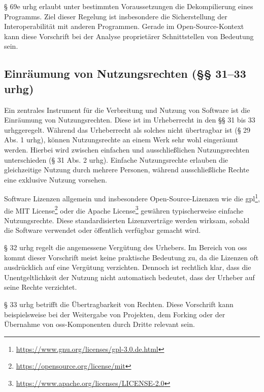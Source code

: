 § 69e \gls{urhg} erlaubt unter bestimmten Voraussetzungen die Dekompilierung eines Programms.
Ziel dieser Regelung ist insbesondere die Sicherstellung der Interoperabilität mit anderen Programmen.
Gerade im Open-Source-Kontext kann diese Vorschrift bei der Analyse proprietärer Schnittstellen von Bedeutung sein.


\subsection{Einräumung von Nutzungsrechten (§§ 31–33 \gls{urhg})}

Ein zentrales Instrument für die Verbreitung und Nutzung von Software ist die Einräumung von Nutzungsrechten.
Diese ist im Urheberrecht in den §§ 31 bis 33 \gls{urhg}geregelt.
Während das Urheberrecht als solches nicht übertragbar ist (§ 29 Abs. 1 \gls{urhg}), können Nutzungsrechte an einem Werk sehr wohl eingeräumt werden.
Hierbei wird zwischen einfachen und ausschließlichen Nutzungsrechten unterschieden (§ 31 Abs. 2 \gls{urhg}).
Einfache Nutzungsrechte erlauben die gleichzeitige Nutzung durch mehrere Personen, während ausschließliche Rechte eine exklusive Nutzung vorsehen.

Software Lizenzen allgemein und insbesondere Open-Source-Lizenzen wie die \gls{gpl}\footnote{\url{https://www.gnu.org/licenses/gpl-3.0.de.html}}, die MIT License\footnote{\url{https://opensource.org/license/mit}} oder die Apache
License\footnote{\url{https://www.apache.org/licenses/LICENSE-2.0}} gewähren typischerweise einfache Nutzungsrechte.
Diese standardisierten Lizenzverträge werden wirksam, sobald die Software verwendet oder öffentlich verfügbar gemacht wird.

§ 32 \gls{urhg} regelt die angemessene Vergütung des Urhebers.
Im Bereich von \gls{oss} kommt dieser Vorschrift meist keine praktische Bedeutung zu, da die Lizenzen oft ausdrücklich auf eine Vergütung verzichten.
Dennoch ist rechtlich klar, dass die Unentgeltlichkeit der Nutzung nicht automatisch bedeutet, dass der Urheber auf seine Rechte verzichtet.

§ 33 \gls{urhg} betrifft die Übertragbarkeit von Rechten.
Diese Vorschrift kann beispielsweise bei der Weitergabe von Projekten, dem Forking oder der Übernahme von \gls{oss}-Komponenten durch Dritte relevant sein.


